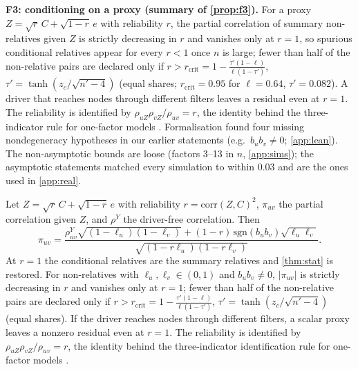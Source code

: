 \textbf{F3: conditioning on a proxy (summary of \cref{prop:f3}).} For a
proxy $Z=\sqrt r\,C+\sqrt{1-r}\,e$ with reliability $r$, the partial
correlation of summary non-relatives given $Z$ is strictly decreasing in $r$
and vanishes only at $r=1$, so spurious conditional relatives appear for every
$r<1$ once $n$ is large; fewer than half of the non-relative pairs are declared
only if $r>r_{\mathrm{crit}}=1-\frac{\tau'(1-\ell)}{\ell(1-\tau')}$,
$\tau'=\tanh(z_c/\sqrt{n'-4})$ (equal shares; $r_{\mathrm{crit}}=0.95$ for
$\ell=0.64$, $\tau'=0.082$). A driver that reaches nodes through different
filters leaves a residual even at $r=1$. The reliability is identified by
$\rho_{uZ}\rho_{vZ}/\rho_{uv}=r$, the identity behind the three-indicator rule
for one-factor models \citep[Ch.~7]{bollen1989structural}. Formalisation found
four missing nondegeneracy hypotheses in our earlier statements (e.g.\
$b_ub_v\ne0$; \cref{app:lean}). The non-asymptotic bounds are loose (factors
3--13 in $n$, \cref{app:sims}); the asymptotic statements matched every
simulation to within $0.03$ and are the ones used in \cref{app:real}.

\begin{proposition}[conditioning]\label{prop:f3}
Let $Z=\sqrt r\,C+\sqrt{1-r}\,e$ with reliability $r=\mathrm{corr}(Z,C)^2$,
$\pi_{uv}$ the partial correlation given $Z$, and $\rho^Y$ the driver-free
correlation. Then
\[
\pi_{uv}=\frac{\rho^Y_{uv}\sqrt{(1{-}\ell_u)(1{-}\ell_v)}+(1{-}r)\,\mathrm{sgn}(b_ub_v)\sqrt{\ell_u\ell_v}}{\sqrt{(1-r\ell_u)(1-r\ell_v)}} .
\]
At $r=1$ the conditional relatives are the summary relatives and
\cref{thm:stat} is restored. For non-relatives with $\ell_u,\ell_v\in(0,1)$ and
$b_ub_v\ne0$, $|\pi_{uv}|$ is strictly decreasing in $r$ and vanishes only at
$r=1$; fewer than half of the non-relative pairs are declared only if
$r>r_{\mathrm{crit}}=1-\frac{\tau'(1-\ell)}{\ell(1-\tau')}$,
$\tau'=\tanh(z_c/\sqrt{n'-4})$ (equal shares). If the driver reaches nodes
through different filters, a scalar proxy leaves a nonzero residual even at
$r=1$. The reliability is identified by $\rho_{uZ}\rho_{vZ}/\rho_{uv}=r$, the
identity behind the three-indicator identification rule for one-factor models
\citep[Ch.~7]{bollen1989structural}.
\end{proposition}

